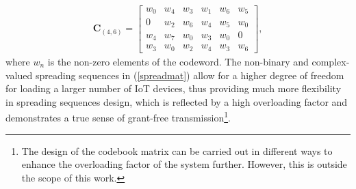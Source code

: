 \documentclass[journal,10pt]{IEEEtran}
\begin{document}
\begin{align} \label{spreadmat}
    \mathbf{C}_{(4,6)} = 
\begin{bmatrix}
w_0 & w_4 & w_3 & w_1 & w_6 & w_5 \\
0        & w_2 & w_6 & w_4 & w_5 & w_0\\
w_4 & w_7 & w_0 & w_3 & w_0 & 0 \\
w_3 & w_0 & w_2 & w_4 & w_3 & w_6
\end{bmatrix},
\end{align}
where $w_n$ is the non-zero elements of the codeword. The non-binary and complex-valued spreading sequences in (\ref{spreadmat}) allow for a higher degree of freedom for loading a larger number of IoT devices, thus providing much more flexibility in spreading sequences design, which is reflected by a high overloading factor and demonstrates a true sense of grant-free transmission\footnote{The design of the codebook matrix can be carried out in different ways \cite{shahab2020grant, 6966170, wang2015comparison, 8704942} to enhance the overloading factor of the system further. However, this is outside the scope of this work.}. 
\end{document}
